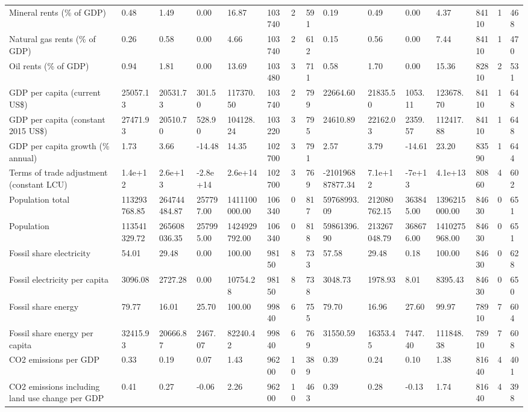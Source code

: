 \begin{longtable}{lllllllllllllll}
\addlinespace
Mineral rents (\% of GDP) & 0.48 & 1.49 & 0.00 & 16.87 & 103740 & 2 & 591 & 0.19 & 0.49 & 0.00 & 4.37 & 84110 & 1 & 468\\
Natural gas rents (\% of GDP) & 0.26 & 0.58 & 0.00 & 4.66 & 103740 & 2 & 612 & 0.15 & 0.56 & 0.00 & 7.44 & 84110 & 1 & 470\\
Oil rents (\% of GDP) & 0.94 & 1.81 & 0.00 & 13.69 & 103480 & 3 & 711 & 0.58 & 1.70 & 0.00 & 15.36 & 82810 & 2 & 531\\
GDP per capita (current US\$) & 25057.13 & 20531.73 & 301.50 & 117370.50 & 103740 & 2 & 799 & 22664.60 & 21835.50 & 1053.11 & 123678.70 & 84110 & 1 & 648\\
GDP per capita (constant 2015 US\$) & 27471.93 & 20510.70 & 528.90 & 104128.24 & 103220 & 3 & 795 & 24610.89 & 22162.03 & 2359.57 & 112417.88 & 84110 & 1 & 648\\
\addlinespace
GDP per capita growth (\% annual) & 1.73 & 3.66 & -14.48 & 14.35 & 102700 & 3 & 791 & 2.57 & 3.79 & -14.61 & 23.20 & 83590 & 1 & 644\\
Terms of trade adjustment (constant LCU) & 1.4e+12 & 2.6e+13 & -2.8e+14 & 2.6e+14 & 102700 & 3 & 769 & -210196887877.34 & 7.1e+12 & -7e+13 & 4.1e+13 & 80860 & 4 & 602\\
Population total & 113293768.85 & 264744484.87 & 257797.00 & 1411100000.00 & 106340 & 0 & 817 & 59768993.09 & 212080762.15 & 363845.00 & 1396215000.00 & 84630 & 0 & 651\\
Population & 113541329.72 & 265608036.35 & 257995.00 & 1424929792.00 & 106340 & 0 & 818 & 59861396.90 & 213267048.79 & 368676.00 & 1410275968.00 & 84630 & 0 & 651\\
Fossil share electricity & 54.01 & 29.48 & 0.00 & 100.00 & 98150 & 8 & 733 & 57.58 & 29.48 & 0.18 & 100.00 & 84630 & 0 & 628\\
\addlinespace
Fossil electricity per capita & 3096.08 & 2727.28 & 0.00 & 10754.28 & 98150 & 8 & 738 & 3048.73 & 1978.93 & 8.01 & 8395.43 & 84630 & 0 & 650\\
Fossil share energy & 79.77 & 16.01 & 25.70 & 100.00 & 99840 & 6 & 755 & 79.70 & 16.96 & 27.60 & 99.97 & 78910 & 7 & 604\\
Fossil share energy per capita & 32415.93 & 20666.87 & 2467.07 & 82240.42 & 99840 & 6 & 769 & 31550.59 & 16353.45 & 7447.40 & 111848.38 & 78910 & 7 & 608\\
CO2 emissions per GDP & 0.33 & 0.19 & 0.07 & 1.43 & 96200 & 10 & 389 & 0.39 & 0.24 & 0.10 & 1.38 & 81640 & 4 & 401\\
CO2 emissions including land use change per GDP & 0.41 & 0.27 & -0.06 & 2.26 & 96200 & 10 & 463 & 0.39 & 0.28 & -0.13 & 1.74 & 81640 & 4 & 398\\

\end{longtable}
